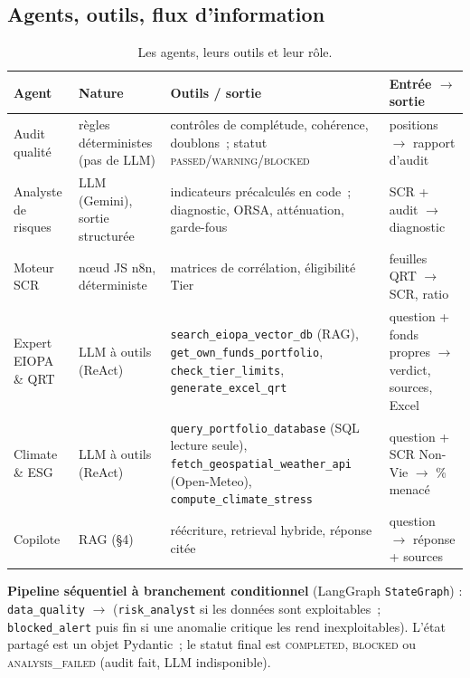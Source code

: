 \documentclass[11pt,a4paper]{article}
\newcommand{\code}[1]{\texttt{\small #1}}
\begin{document}
\subsection{Agents, outils, flux d'information}
\begin{table}[h]\centering\small
\begin{tabularx}{\textwidth}{@{}>{\raggedright\arraybackslash}p{2.5cm}>{\raggedright\arraybackslash}p{2.6cm}>{\raggedright\arraybackslash}X>{\raggedright\arraybackslash}p{3.2cm}@{}}\toprule
\textbf{Agent} & \textbf{Nature} & \textbf{Outils / sortie} & \textbf{Entr\'ee $\to$ sortie}\\\midrule
Audit qualit\'e & r\`egles d\'eterministes (pas de LLM) & contr\^oles de compl\'etude, coh\'erence, doublons~; statut \textsc{passed/warning/blocked} & positions $\to$ rapport d'audit\\
Analyste de risques & LLM (Gemini), sortie structur\'ee & indicateurs pr\'ecalcul\'es en code~; diagnostic, ORSA, att\'enuation, garde-fous & SCR + audit $\to$ diagnostic\\
Moteur SCR & n\oe ud JS n8n, d\'eterministe & matrices de corr\'elation, \'eligibilit\'e Tier & feuilles QRT $\to$ SCR, ratio\\
Expert EIOPA \& QRT & LLM \`a outils (ReAct) & \code{search\_eiopa\_vector\_db} (RAG), \code{get\_own\_funds\_portfolio}, \code{check\_tier\_limits}, \code{generate\_excel\_qrt} & question + fonds propres $\to$ verdict, sources, Excel\\
Climate \& ESG & LLM \`a outils (ReAct) & \code{query\_portfolio\_database} (SQL lecture seule), \code{fetch\_geospatial\_weather\_api} (Open-Meteo), \code{compute\_climate\_stress} & question + SCR Non-Vie $\to$ \% menac\'e\\
Copilote & RAG (\S4) & r\'e\'ecriture, retrieval hybride, r\'eponse cit\'ee & question $\to$ r\'eponse + sources\\\bottomrule
\end{tabularx}
\caption{Les agents, leurs outils et leur r\^ole.}
\end{table}
\textbf{Pipeline s\'equentiel \`a branchement conditionnel} (LangGraph \code{StateGraph}) : \code{data\_quality} $\to$ (\code{risk\_analyst} si les donn\'ees sont exploitables~; \code{blocked\_alert} puis fin si une anomalie critique les rend inexploitables). L'\'etat partag\'e est un objet Pydantic~; le statut final est \textsc{completed}, \textsc{blocked} ou \textsc{analysis\_failed} (audit fait, LLM indisponible).
\end{document}
